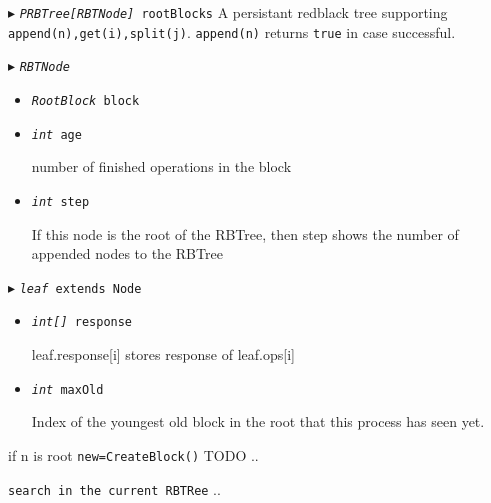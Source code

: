 \documentclass[10pt]{article}
\newcommand\keywordfont{\sffamily\bfseries}
\theoremstyle{definition}
\begin{document}
\begin{algorithm}
\begin{algorithmic}[1]
\begin{multicols}{2}

\Statex $\blacktriangleright$ \texttt{\textsl{PRBTree[RBTNode]} rootBlocks}
  \Statex \textsf{A persistant redblack tree supporting \texttt{append(n),get(i),split(j)}}. \texttt{append(n)} returns \texttt{true} in case successful.


\Statex $\blacktriangleright$ \texttt{\textsl{RBTNode}}
\begin{itemize}

  \item \texttt{\textsl{RootBlock} block}



  \item \texttt{\textsl{int} age}
  
  \textsf{number of finished operations in the block}

  \item \texttt{\textsl{int} step}
  
  \textsf{If this node is the root of the RBTree, then step shows the number of appended nodes to the RBTree}

\end{itemize}


\Statex $\blacktriangleright$ \texttt{\textsl{leaf} extends Node}
\begin{itemize}
  \item \texttt{\textsl{int[]} response}
  
  \textsf{leaf.response[i] stores response of leaf.ops[i]}
  
  \item \texttt{\textsl{int} maxOld}

  \textsf{Index of the youngest old block in the root that this process has seen yet.}
  
\end{itemize}

\Statex



 \Comment if n is root
\State \texttt{new=CreateBlock()} \Comment TODO
 
\Statex..\EndIf
{}

\Statex

 
\If{\texttt{n {\keywordfont is} root}} \Return \texttt{search in the current RBTRee}
\Else
..
\EndIf
{}


\end{multicols}
\end{algorithmic}
\end{algorithm}
\end{document}

